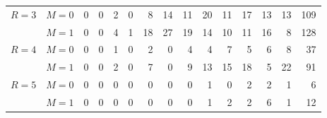 \begin{table}
\begin{center}
\begin{tabular}{rrrrrrrrrrrrrrr}
\midrule
\multirow{2}{*}{$R=3$} & $M=0$ & 0 & 0 & 2 & 0 & \cellcolor[gray]{0.9} 8 & \cellcolor[gray]{0.9} 14 & 11 & 20 & 11 & 17 & 13 & 13 & 109 \\
 & $M=1$ & 0 & 0 & 4 & 1 & \cellcolor[gray]{0.9} 18 & \cellcolor[gray]{0.9} 27 & 19 & 14 & 10 & 11 & 16 & 8 & 128 \\ 

\midrule
\multirow{2}{*}{$R=4$} & $M=0$ & 0 & 0 & 1 & 0 & 2 & 0 & \cellcolor[gray]{0.9} 4 & \cellcolor[gray]{0.9} 4 & 7 & 5 & 6 & 8 & 37 \\
 & $M=1$ & 0 & 0 & 2 & 0 & 7 & 0 & \cellcolor[gray]{0.9} 9 & \cellcolor[gray]{0.9} 13 & 15 & 18 & 5 & 22 & 91 \\ 

\midrule
\multirow{2}{*}{$R=5$} & $M=0$ & 0 & 0 & 0 & 0 & 0 & 0 & 0 & 1 & \cellcolor[gray]{0.9} 0 & \cellcolor[gray]{0.9} 2 & 2 & 1 & 6 \\
 & $M=1$ & 0 & 0 & 0 & 0 & 0 & 0 & 0 & 1 & \cellcolor[gray]{0.9} 2 & \cellcolor[gray]{0.9} 2 & 6 & 1 & 12 \\ 


\end{tabular}
\end{center}
\end{table}
